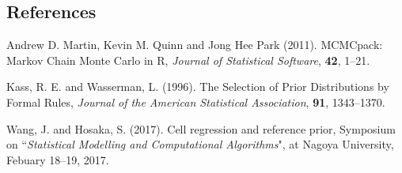 \documentclass[12pt]{article}
\begin{document}
%        
%
%        

\subsection*{References}

\begin{description}

\item

Andrew D. Martin, Kevin M. Quinn and Jong Hee Park (2011).
MCMCpack: Markov Chain Monte Carlo in R,
\textit {Journal of Statistical Software}, \textbf {42}, 1--21.

\item
Kass, R. E. and Wasserman, L. (1996).
The Selection of Prior Distributions by Formal Rules,
\textit {Journal of the American Statistical Association}, \textbf {91}, 1343--1370.

\item 
Wang, J. and Hosaka, S. (2017). Cell regression and reference prior,
Symposium on ``\textit {Statistical Modelling and Computational Algorithms}", at Nagoya University, Febuary 18--19, 2017.

\end{description}
\end{document}
